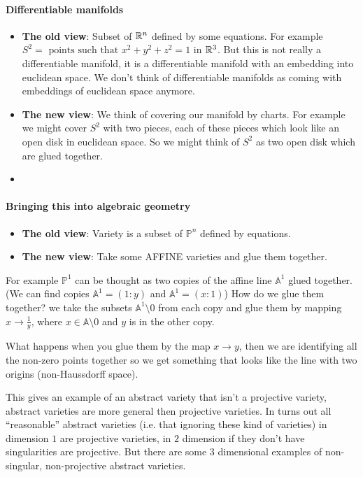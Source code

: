 \paragraph*{Differentiable manifolds}
\begin{itemize}
    \item \textbf{The old view}: Subset of $\mathbb{R}^n$ defined by some equations. For example $S^2 = \text{ points such that }x^2+y^2+z^2 = 1$ in $\mathbb{R}^3$. But this is not really a differentiable manifold, it is a differentiable manifold with an embedding into euclidean space.
We don't think of differentiable manifolds as coming with embeddings of euclidean space anymore.

    \item \textbf{The new view}: We think of covering our manifold by charts. For example we might cover $S^2$ with two pieces, each of these pieces which look like an open disk in euclidean space. So we might think of $S^2$ as two open disk which are glued together.
    \item   
\end{itemize}


\paragraph*{Bringing this into algebraic geometry}
\begin{itemize}
    \item \textbf{The old view}: Variety is a subset of $\mathbb{P}^n$ defined by equations.
    \item \textbf{The new view}: Take some AFFINE varieties and glue them together.
\end{itemize}

For example $\mathbb{P}^1$ can be thought as two copies of the affine line $\mathbb{A}^1$ glued together. (We can find copies $\mathbb{A}^1 = (1\colon y)$ and $\mathbb{A}^1 = (x\colon 1)$) How do we glue them together? we take the subsets $\mathbb{A}^1\setminus 0$ from each copy and glue them by mapping $x\rightarrow \frac{1}{y}$, where $x\in \mathbb{A}\setminus 0$ and $y$ is in the other copy. 

What happens when you glue them by the map $x\rightarrow y$, then we are identifying all the non-zero points together so we get something that looks like the line with two origins (non-Haussdorff space).

This gives an example of an abstract variety that isn't a projective variety, abstract varieties are more general then projective varieties. In turns out all ``reasonable'' abstract varieties (i.e. that ignoring these kind of varieties) in dimension $1$ are projective varieties, in $2$ dimension if they don't have singularities are projective. But there are some 3 dimensional examples of non-singular, non-projective abstract varieties.

